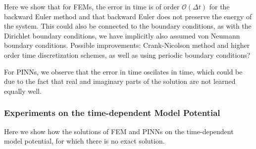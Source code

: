 \documentclass{article}
\theoremstyle{definition}
\theoremstyle{plain}
\theoremstyle{remark}
\begin{document}
Here we show that for FEMs, the error in time is of order $\mathcal{O}(\Delta t)$ for the backward Euler method and that backward Euler does not preserve the energy of the system. This could also be connected to the boundary conditions, as with the Dirichlet boundary conditions, we have implicitly also assumed von Neumann boundary conditions. Possible improvements: Crank-Nicolson method and higher order time discretization schemes, as well as using periodic boundary conditions?

For PINNs, we observe that the error in time oscilates in time, which could be due to the fact that real and imaginary parts of the solution are not learned equally well.

\subsubsection*{Experiments on the time-dependent Model Potential}

Here we show how the solutions of FEM and PINNs on the time-dependent model potential, for which there is no exact solution. 
\end{document}
